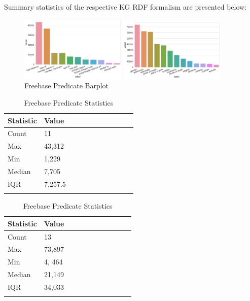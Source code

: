 \noindent Summary statistics of the respective KG RDF formalism are presented below:

\medskip

\begin{figure}[H]
	\parbox{.5\linewidth}{
   		\centering
    		\includegraphics[width=0.45\textwidth, height=0.2\textheight]{Wordnet_Predicate_Counts}
		\caption{Wordnet Predicate Barplot}
		}
	\hfill
	\parbox{.5\linewidth}{
   		\centering
		\includegraphics[width=0.45\textwidth, height=0.2\textheight]{Freebase_Predicate_Counts}
		\caption{Freebase Predicate Barplot}
		}
\end{figure}

\begin{table}[H]
	\parbox{.5\linewidth}{
		\centering
		\begin{tabular}{lllllllllll}
  			\textbf{Statistic} & \textbf{Value}  \\
  			\hline
			Count & 11 \\
			Max & 43,312  \\
			Min & 1,229  \\
  			Median & 7,705  \\
  			IQR & 7,257.5  \\
				&
		\end{tabular}
		\caption{Wordnet Predicate Statistics}
		}
	\hfill
	\parbox{.5\linewidth}{
		\centering
		\begin{tabular}{lllllllllll}
  			\textbf{Statistic} & \textbf{Value}  \\
  			\hline
			Count & 13 \\
			Max & 73,897  \\
			Min & 4, 464  \\
  			Median & 21,149  \\
  			IQR & 34,033  \\
				&
		\end{tabular} 
		\caption{Freebase Predicate Statistics}
		}
\end{table}


